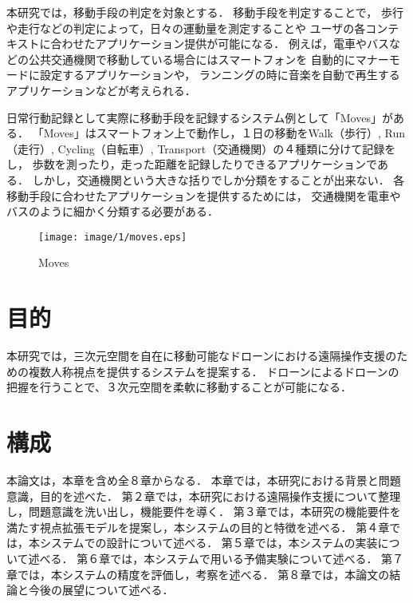 本研究では，移動手段の判定を対象とする．
移動手段を判定することで，
歩行や走行などの判定によって，日々の運動量を測定することや
ユーザの各コンテキストに合わせたアプリケーション提供が可能になる．
例えば，電車やバスなどの公共交通機関で移動している場合にはスマートフォンを
自動的にマナーモードに設定するアプリケーションや，
ランニングの時に音楽を自動で再生するアプリケーションなどが考えられる．

日常行動記録として実際に移動手段を記録するシステム例として「Moves」\cite{Moves}がある．
「Moves」はスマートフォン上で動作し，１日の移動をWalk（歩行）, Run（走行）, Cycling（自転車）, Transport（交通機関）の４種類に分けて記録をし，
歩数を測ったり，走った距離を記録したりできるアプリケーションである．
しかし，交通機関という大きな括りでしか分類をすることが出来ない．
各移動手段に合わせたアプリケーションを提供するためには，
交通機関を電車やバスのように細かく分類する必要がある．

\begin{figure}[htbp]
 \begin{center}
  \texttt{[image: image/1/moves.eps]}
 \end{center}
 \caption{Moves\cite{Moves}}
 \label{moves}
\end{figure}


\section{目的}
本研究では，三次元空間を自在に移動可能なドローンにおける遠隔操作支援のための複数人称視点を提供するシステムを提案する．
ドローンによるドローンの把握を行うことで、３次元空間を柔軟に移動することが可能になる．




\section{構成}
本論文は，本章を含め全８章からなる．
本章では，本研究における背景と問題意識，目的を述べた．
第２章では，本研究における遠隔操作支援について整理し，問題意識を洗い出し，機能要件を導く．
第３章では，本研究の機能要件を満たす視点拡張モデルを提案し，本システムの目的と特徴を述べる．
第４章では，本システムでの設計について述べる．
第５章では，本システムの実装について述べる．
第６章では，本システムで用いる予備実験について述べる．
第７章では，本システムの精度を評価し，考察を述べる．
第８章では，本論文の結論と今後の展望について述べる．

